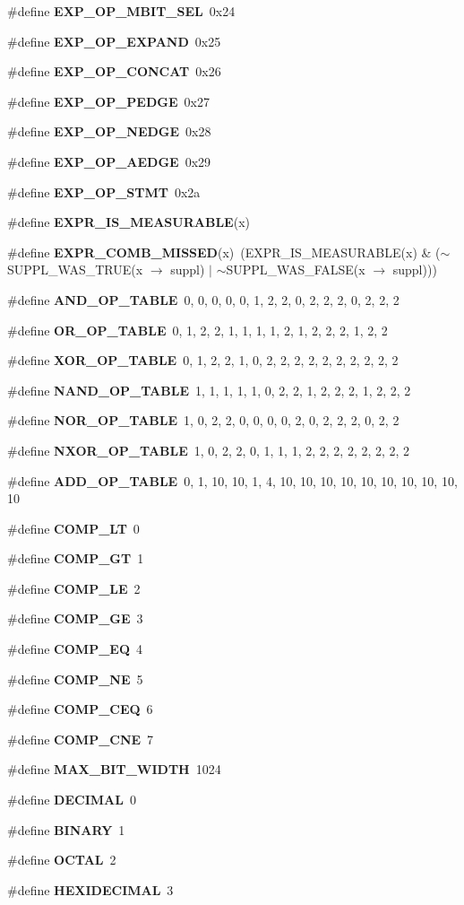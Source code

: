 \begin{CompactItemize}
\#define {\bf EXP\_\-OP\_\-MBIT\_\-SEL}\ 0x24
\item 
\#define {\bf EXP\_\-OP\_\-EXPAND}\ 0x25
\item 
\#define {\bf EXP\_\-OP\_\-CONCAT}\ 0x26
\item 
\#define {\bf EXP\_\-OP\_\-PEDGE}\ 0x27
\item 
\#define {\bf EXP\_\-OP\_\-NEDGE}\ 0x28
\item 
\#define {\bf EXP\_\-OP\_\-AEDGE}\ 0x29
\item 
\#define {\bf EXP\_\-OP\_\-STMT}\ 0x2a
\item 
\#define {\bf EXPR\_\-IS\_\-MEASURABLE}(x)
\item 
\#define {\bf EXPR\_\-COMB\_\-MISSED}(x)\ (EXPR\_\-IS\_\-MEASURABLE(x) \& ($\sim$SUPPL\_\-WAS\_\-TRUE(x $\rightarrow$ suppl) $|$ $\sim$SUPPL\_\-WAS\_\-FALSE(x $\rightarrow$ suppl)))
\item 
\#define {\bf AND\_\-OP\_\-TABLE}\ 0,  0,  0,  0,  0,  1,  2,  2,  0,  2,  2,  2,  0,  2,  2,  2
\item 
\#define {\bf OR\_\-OP\_\-TABLE}\ 0,  1,  2,  2,  1,  1,  1,  1,  2,  1,  2,  2,  2,  1,  2,  2
\item 
\#define {\bf XOR\_\-OP\_\-TABLE}\ 0,  1,  2,  2,  1,  0,  2,  2,  2,  2,  2,  2,  2,  2,  2,  2
\item 
\#define {\bf NAND\_\-OP\_\-TABLE}\ 1,  1,  1,  1,  1,  0,  2,  2,  1,  2,  2,  2,  1,  2,  2,  2
\item 
\#define {\bf NOR\_\-OP\_\-TABLE}\ 1,  0,  2,  2,  0,  0,  0,  0,  2,  0,  2,  2,  2,  0,  2,  2
\item 
\#define {\bf NXOR\_\-OP\_\-TABLE}\ 1,  0,  2,  2,  0,  1,  1,  1,  2,  2,  2,  2,  2,  2,  2,  2
\item 
\#define {\bf ADD\_\-OP\_\-TABLE}\ 0,  1,  10, 10, 1,  4,  10, 10, 10, 10, 10, 10, 10, 10, 10, 10
\item 
\#define {\bf COMP\_\-LT}\ 0
\item 
\#define {\bf COMP\_\-GT}\ 1
\item 
\#define {\bf COMP\_\-LE}\ 2
\item 
\#define {\bf COMP\_\-GE}\ 3
\item 
\#define {\bf COMP\_\-EQ}\ 4
\item 
\#define {\bf COMP\_\-NE}\ 5
\item 
\#define {\bf COMP\_\-CEQ}\ 6
\item 
\#define {\bf COMP\_\-CNE}\ 7
\item 
\#define {\bf MAX\_\-BIT\_\-WIDTH}\ 1024
\item 
\#define {\bf DECIMAL}\ 0
\item 
\#define {\bf BINARY}\ 1
\item 
\#define {\bf OCTAL}\ 2
\item 
\#define {\bf HEXIDECIMAL}\ 3
\end{CompactItemize}
